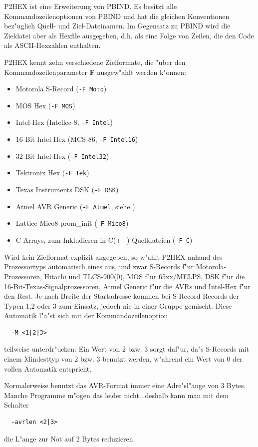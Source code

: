 \documentclass[12pt,a4paper,twoside]{report}
\newcommand{\bb}[1]{{\bf #1}}
\newcommand{\tty}[1]{{\tt #1}}
\begin{document}
P2HEX ist eine Erweiterung von PBIND.  Es besitzt alle
Kommandozeilenoptionen von PBIND und hat die gleichen Konventionen
bez"uglich Quell- und Ziel-Dateinamen.  Im Gegensatz zu PBIND wird
die Zieldatei aber als Hexfile ausgegeben, d.h. als eine Folge von
Zeilen, die den Code als ASCII-Hexzahlen enthalten.
\par
P2HEX kennt zehn verschiedene Zielformate, die "uber den
Kommandozeilenparameter \bb{F} ausgew"ahlt werden k"onnen:
\begin{itemize}
\item{Motorola S-Record (\tty{-F Moto})}
\item{MOS Hex (\tty{-F MOS})}
\item{Intel-Hex (Intellec-8, \tty{-F Intel})}
\item{16-Bit Intel-Hex (MCS-86, \tty{-F Intel16})}
\item{32-Bit Intel-Hex (\tty{-F Intel32})}
\item{Tektronix Hex (\tty{-F Tek})}
\item{Texas Instruments DSK (\tty{-F DSK})}
\item{Atmel AVR Generic (\tty{-F Atmel}, siehe \cite{AVRObj})}
\item{Lattice Mico8 prom\_init (\tty{-F Mico8})}
\item{C-Arrays, zum Inkludieren in C(++)-Quelldateien (\tty{-F C})}
\end{itemize}
Wird kein Zielformat explizit angegeben, so w"ahlt P2HEX anhand des
Prozessortyps automatisch eines aus, und zwar S-Records f"ur Motorola-
Prozessoren, Hitachi und TLCS-900(0), MOS f"ur 65xx/MELPS, DSK f"ur die
16-Bit-Texas-Signalprozessoren, Atmel Generic f"ur die AVRs und Intel-Hex
f"ur den Rest. Je nach Breite der Startadresse kommen bei S-Record Records
der Typen 1,2 oder 3 zum Einsatz, jedoch nie in einer Gruppe gemischt.
Diese Automatik l"a"st sich mit der Kommandozeilenoption
\begin{verbatim}
  -M <1|2|3>
\end{verbatim}
teilweise unterdr"ucken: Ein Wert von 2 bzw. 3 sorgt daf"ur, da"s
S-Records mit einem Mindesttyp von 2 bzw. 3 benutzt werden, w"ahrend ein
Wert von 0 der vollen Automatik entspricht.

Normalerweise benutzt das AVR-Format immer eine Adre"sl"ange von 3 Bytes.
Manche Programme m"ogen das leider nicht...deshalb kann man mit dem
Schalter
\begin{verbatim}
  -avrlen <2|3>
\end{verbatim}
die L"ange zur Not auf 2 Bytes reduzieren.
\end{document}
